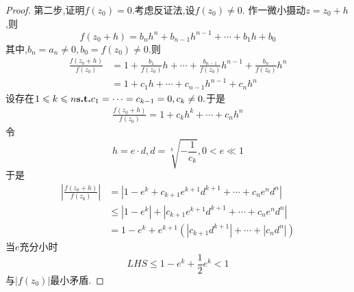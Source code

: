 {\begin{proof}
        第二步,证明$f\left(z_0\right)=0.$考虑反证法,设$f\left(z_0\right)\neq 0.$ 作一微小摄动$z=z_0+h$,则
        \[
            f\left(z_0+h\right)=b_nh^n+b_{n-1}h^{n-1}+\cdots+b_1h+b_0
        \]
        其中,$b_n=a_n\neq 0,b_0=f\left(z_0\right)\neq 0.$则
        \begin{align*}
            \frac{f\left(z_0+h\right)}{f\left(z_0\right)} & =1+\frac{b_1}{f\left(z_0\right)}h+
            \cdots+\frac{b_{n-1}}{f\left(z_0\right)}h^{n-1}+\frac{b_n}{f\left(z_0\right)}h^n     \\
                                                          & =1+c_1h+\cdots+c_{n-1}h^{n-1}+c_nh^n
        \end{align*}
        设存在$1\leqslant k\leqslant n\textup{\bfseries{s.t.}} c_1=\cdots=c_{k-1}=0,c_k\neq 0.
        $于是
        \begin{align*}
            \frac{f\left(z_0+h\right)}{f\left(z_0\right)}=1+c_kh^k+\cdots+c_nh^n
        \end{align*}
        令\[
            h=e\cdot d,d=\sqrt[k]{-\frac{1}{c_k}},0<e\ll 1\]于是
        \begin{align*}
            \left|
            \frac{f\left(z_0+h\right)}{f\left(z_0\right)}\right| & =
            \left|1-e^k+c_{k+1}e^{k+1}d^{k+1}+\cdots+c_ne^nd^n
            \right|
            \\
                                                                 & \leqslant
            \left|1-e^k\right|+\left|c_{k+1}e^{k+1}d^{k+1}+\cdots+c_ne^nd^n
            \right|                                                                                                                                  \\
                                                                 & =1-e^k+e^{k+1}\left(\left|c_{k+1}d^{k+1}\right|+\cdots+\left|c_nd^n\right|\right)
        \end{align*}
        当$e$充分小时\[
            LHS\leqslant 1-e^k+\frac{1}{2}e^k<1\]与$\left|f\left(z_0\right)\right|$最小矛盾.
    \end{proof}
}
